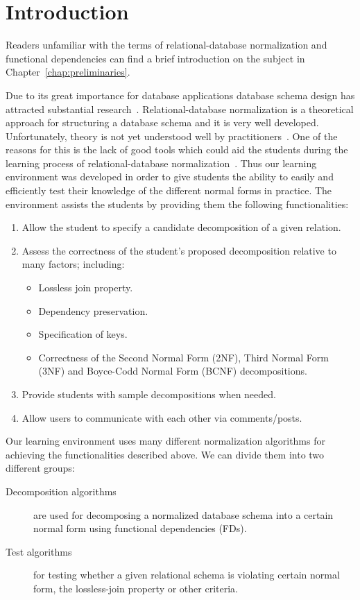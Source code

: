 \chapter{Introduction}
\label{chap:introduction}
Readers unfamiliar with the terms of relational-database normalization and 
functional dependencies can find a brief introduction on the subject in
Chapter~\ref{chap:preliminaries}. 

Due to its great importance for database applications database schema design has
attracted substantial research~\cite{p1}. Relational-database normalization is a 
theoretical approach for structuring a database schema and it is very well developed. 
Unfortunately, theory is not yet understood well by practitioners~\cite{p1}.
One of the reasons for this is the lack of good tools which could aid the students 
during the learning process of relational-database normalization~\cite{p8}. 
Thus our learning environment was developed in order to give students the ability to 
easily and efficiently test
their knowledge of the different normal forms in practice. The environment assists the students by 
providing them the following functionalities:

\begin{enumerate}
	\item Allow the student to specify a candidate decomposition of a given relation.
	\item Assess the correctness of the student's proposed decomposition relative to many factors; including:
		\begin{itemize}
			\item Lossless join property.
			\item Dependency preservation.
			\item Specification of keys.
			\item Correctness of the Second Normal Form (2NF), Third Normal Form (3NF) and
			 Boyce-Codd Normal Form (BCNF) decompositions.
		\end{itemize}
	\item Provide students with sample decompositions when needed. 
	\item Allow users to communicate with each other via comments/posts.
\end{enumerate}

Our learning environment uses many different normalization 
algorithms for achieving the functionalities described above. 
We can divide them into two different groups:

\begin{description}
	\item[Decomposition algorithms] are used for decomposing a normalized database 
	schema into a certain normal form using functional dependencies (FDs).
	\item[Test algorithms] for testing whether a given relational schema is 
	violating certain normal form, the lossless-join property or other criteria.
\end{description}

